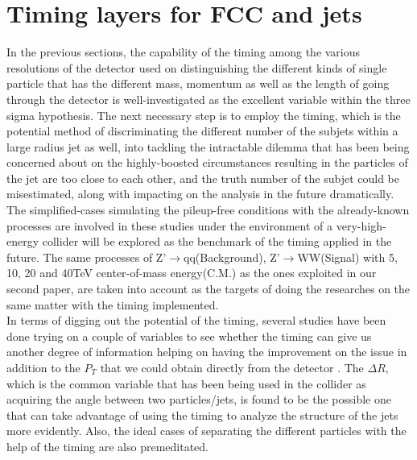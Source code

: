 \section{Timing layers for FCC and jets}
In the previous sections, the capability of the timing among the various resolutions of the detector used on distinguishing the different kinds of single particle that has the different mass, momentum as well as the length of going through the detector is well-investigated as the excellent variable within the three sigma hypothesis. The next necessary step is to employ the timing, which is the potential method of discriminating the different number of the subjets within a large radius jet as well, into tackling the intractable dilemma that has been being concerned about on the highly-boosted circumstances resulting in the particles of the jet are too close to each other, and the truth number of the subjet could be misestimated, along with impacting on the analysis in the future dramatically.\\ 

The simplified-cases simulating the pileup-free conditions with the already-known processes are involved in these studies under the environment of a very-high-energy collider will be explored as the benchmark of the timing applied in the future. The same processes of Z'$\rightarrow$qq(Background), Z'$\rightarrow$WW(Signal) with 5, 10, 20 and 40TeV center-of-mass energy(C.M.) as the ones exploited in our second paper, are taken into account as the targets of doing the researches on the same matter with the timing implemented.\\ 

In terms of digging out the potential of the timing, several studies have been done trying on a couple of variables to see whether the timing can give us another degree of information helping on having the improvement on the issue in addition to the $P_{T}$ that we could obtain directly from the detector . The $\Delta R$, which is the common variable that has been being used in the collider as acquiring the angle between two particles/jets, is found to be the possible one that can take advantage of using the timing to analyze the structure of the jets more evidently. Also, the ideal cases of separating the different particles with the help of the timing are also premeditated.\\

